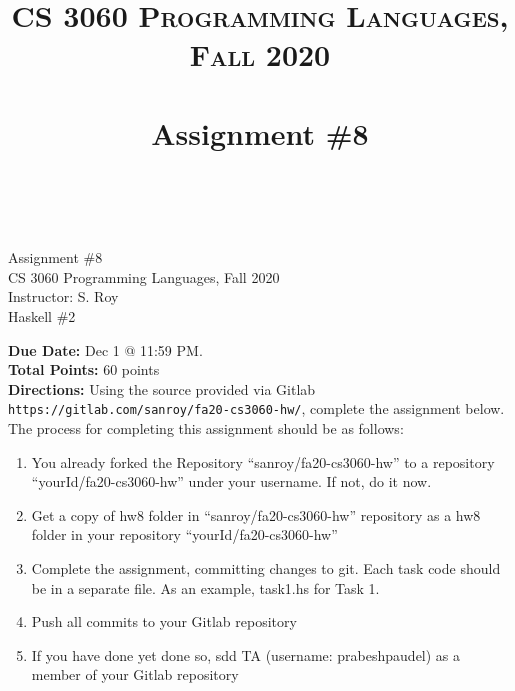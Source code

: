 \documentclass[paper=letter, fontsize=11pt]{scrartcl} %
\title{ 
    \normalfont \normalsize 
    \textsc{CS 3060 Programming Languages, Fall 2020} \\ [25pt] %
    \horrule{0.5pt} \\[0.4cm] %
    \huge Assignment \#8  \\ %
    \horrule{2pt} \\[0.5cm] %
}
\begin{document}
    \begin{center}
         Assignment \#8\\
        \small CS 3060 Programming Languages, Fall 2020 \\
        \small Instructor: S. Roy \\
        \huge Haskell \#2
    \end{center}
    
    \textbf{Due Date:} Dec 1 @ 11:59 PM. \\
    \textbf{Total Points:} 60 points \\

    \textbf{Directions:} Using the source provided via Gitlab \@ \texttt{https://gitlab.com/sanroy/fa20-cs3060-hw/},
complete the assignment below. The process for completing this assignment should be as follows:

    \begin{enumerate}[noitemsep]
        \item You already forked the Repository ``sanroy/fa20-cs3060-hw'' to a repository ``yourId/fa20-cs3060-hw'' under your username. If not, do it now.
        \item Get a copy of hw8 folder in ``sanroy/fa20-cs3060-hw'' repository as a hw8 folder in your repository ``yourId/fa20-cs3060-hw''
        \item Complete the assignment, committing changes to git. Each task code should be in a separate file. As an example, task1.hs for Task 1.
        \item Push all commits to your Gitlab repository
        \item If you have done yet done so, sdd TA (username: prabeshpaudel) as a member of your Gitlab repository
    \end{enumerate}
\end{document}
